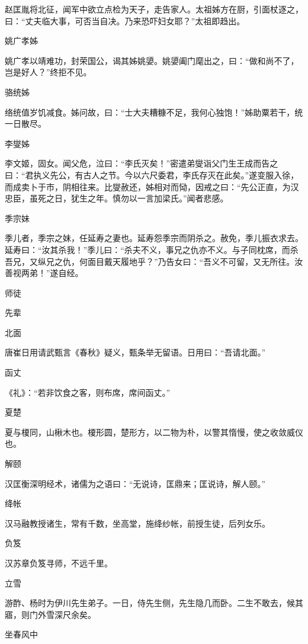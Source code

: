 \documentclass[a4paper,12pt,UTF8,twoside]{ctexbook}
\begin{document}
    赵匡胤将北征，闻军中欲立点检为天子，走告家人。太祖姊方在厨，引面杖逐之，曰：“丈夫临大事，可否当自决。乃来恐吓妇女耶？”太祖即趋出。
    
    姚广孝姊
    
    姚广孝以靖难功，封荣国公，谒其姊姚嬃。姚嬃阖门麾出之，曰：“做和尚不了，岂是好人？”终拒不见。
    
    骆统姊
    
    络统值岁饥减食。姊问故，曰：“士大夫糟糠不足，我何心独饱！”姊助粟若干，统一日散尽。
    
    李燮姊
    
    李文姬，固女。闻父危，泣曰：“李氏灭矣！”密遣弟燮诣父门生王成而告之曰：“君执义先公，有古人之节。今以六尺委君，李氏存灭在此矣。”遂变服入徐，而成卖卜于市，阴相往来。比燮赦还，姊相对而恸，因戒之曰：“先公正直，为汉忠臣，虽死之日，犹生之年。慎勿以一言加梁氏。”闻者悲感。
    
    季宗妹
    
    季儿者，季宗之妹，任延寿之妻也。延寿怨季宗而阴杀之。赦免，季儿振衣求去。延寿曰：“汝其杀我！”季儿曰：“杀夫不义，事兄之仇亦不义。与子同枕席，而杀吾兄，又纵兄之仇，何面目戴天履地乎？”乃告女曰：“吾义不可留，又无所往。汝善视两弟！”遂自经。
    
    师徒
    
    先辈
    
    北面
    
    唐崔日用请武甄言《春秋》疑义，甄条举无留语。日用曰：“吾请北面。”
    
    函丈
    
    《礼》：“若非饮食之客，则布席，席间函丈。”
    
    夏楚
    
    夏与榎同，山楸木也。榎形圆，楚形方，以二物为朴，以警其惰慢，使之收敛威仪也。
    
    解颐
    
    汉匡衡深明经术，诸儒为之语曰：“无说诗，匡鼎来；匡说诗，解人颐。”
    
    绛帐
    
    汉马融教授诸生，常有千数，坐高堂，施绛纱帐，前授生徒，后列女乐。
    
    负笈
    
    汉苏章负笈寻师，不远千里。
    
    立雪
    
    游酢、杨时为伊川先生弟子。一日，侍先生侧，先生隐几而卧。二生不敢去，候其寤，则门外雪深尺余矣。
    
    坐春风中
    
\end{document}
